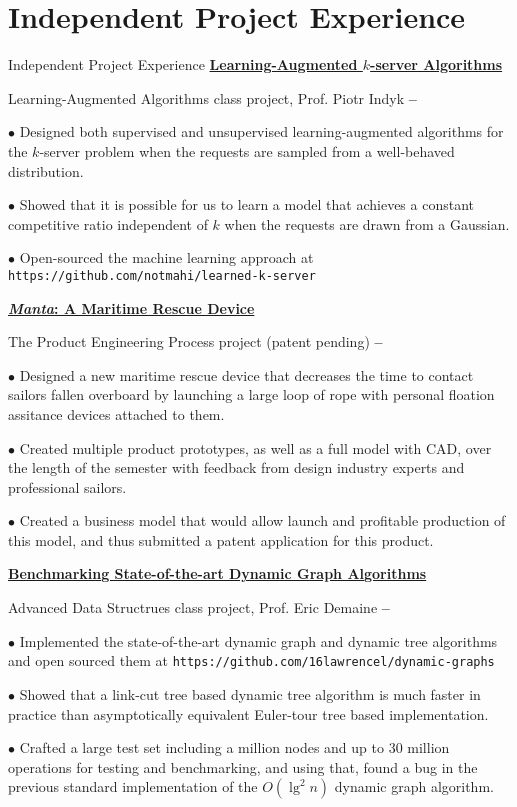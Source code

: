 
\section{Independent Project Experience}
{Independent Project Experience}
\href{https://github.com/notmahi/learned-k-server}
{\textbf{Learning-Augmented $k$-server Algorithms}}
\par
Learning-Augmented Algorithms class project, Prof. Piotr Indyk
\hfill
\textbf{ --
}
\SmallEntryGap
\begin{detail}
$\bullet$ Designed both supervised and unsupervised learning-augmented algorithms for the $k$-server problem when the requests are sampled from a well-behaved distribution.

$\bullet$ Showed that it is possible for us to learn a model that achieves a constant competitive ratio independent of $k$ when the requests are drawn from a Gaussian.

$\bullet$ Open-sourced the machine learning approach at \texttt{https://github.com/notmahi/learned-k-server}
\end{detail}
\EntryGap
\href{https://www.youtube.com/watch?v=vVIKaj2X-OE}
{\textbf{\textit{Manta}: A Maritime Rescue Device}}
\par
The Product Engineering Process project (patent pending)
\hfill
\textbf{ --
}
\SmallEntryGap
\begin{detail}
$\bullet$ Designed a new maritime rescue device that decreases the time to contact sailors fallen overboard by launching a large loop of rope with personal floation assitance devices attached to them.

$\bullet$ Created multiple product prototypes, as well as a full model with CAD, over the length of the semester with feedback from design industry experts and professional sailors.

$\bullet$ Created a business model that would allow launch and profitable production of this model, and thus submitted a patent application for this product.
\end{detail}
\EntryGap
\href{https://github.com/16lawrencel/dynamic-graphs}
{\textbf{Benchmarking State-of-the-art Dynamic Graph Algorithms}}
\par
Advanced Data Structrues class project, Prof. Eric Demaine
\hfill
\textbf{ --
}
\SmallEntryGap
\begin{detail}
$\bullet$ Implemented the state-of-the-art dynamic graph and dynamic tree algorithms and open sourced them at \texttt{https://github.com/16lawrencel/dynamic-graphs}

$\bullet$ Showed that a link-cut tree based dynamic tree algorithm is much faster in practice than asymptotically equivalent Euler-tour tree based implementation.

$\bullet$ Crafted a large test set including a million nodes and up to 30 million operations for testing and benchmarking, and using that, found a bug in the previous standard implementation of the $O(\lg ^2 n)$ dynamic graph algorithm.
\end{detail}
